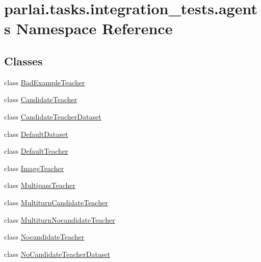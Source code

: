 \hypertarget{namespaceparlai_1_1tasks_1_1integration__tests_1_1agents}{}\section{parlai.\+tasks.\+integration\+\_\+tests.\+agents Namespace Reference}
\label{namespaceparlai_1_1tasks_1_1integration__tests_1_1agents}
\subsection*{Classes}
\begin{DoxyCompactItemize}
\item 
class \hyperlink{classparlai_1_1tasks_1_1integration__tests_1_1agents_1_1BadExampleTeacher}{Bad\+Example\+Teacher}
\item 
class \hyperlink{classparlai_1_1tasks_1_1integration__tests_1_1agents_1_1CandidateTeacher}{Candidate\+Teacher}
\item 
class \hyperlink{classparlai_1_1tasks_1_1integration__tests_1_1agents_1_1CandidateTeacherDataset}{Candidate\+Teacher\+Dataset}
\item 
class \hyperlink{classparlai_1_1tasks_1_1integration__tests_1_1agents_1_1DefaultDataset}{Default\+Dataset}
\item 
class \hyperlink{classparlai_1_1tasks_1_1integration__tests_1_1agents_1_1DefaultTeacher}{Default\+Teacher}
\item 
class \hyperlink{classparlai_1_1tasks_1_1integration__tests_1_1agents_1_1ImageTeacher}{Image\+Teacher}
\item 
class \hyperlink{classparlai_1_1tasks_1_1integration__tests_1_1agents_1_1MultipassTeacher}{Multipass\+Teacher}
\item 
class \hyperlink{classparlai_1_1tasks_1_1integration__tests_1_1agents_1_1MultiturnCandidateTeacher}{Multiturn\+Candidate\+Teacher}
\item 
class \hyperlink{classparlai_1_1tasks_1_1integration__tests_1_1agents_1_1MultiturnNocandidateTeacher}{Multiturn\+Nocandidate\+Teacher}
\item 
class \hyperlink{classparlai_1_1tasks_1_1integration__tests_1_1agents_1_1NocandidateTeacher}{Nocandidate\+Teacher}
\item 
class \hyperlink{classparlai_1_1tasks_1_1integration__tests_1_1agents_1_1NoCandidateTeacherDataset}{No\+Candidate\+Teacher\+Dataset}
\end{DoxyCompactItemize}
